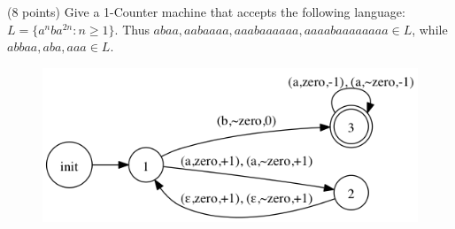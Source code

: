 \documentclass[paper=a4, fontsize=11pt]{scrartcl} %
\begin{document}
\pagebreak

\section{}

\begin{fancyquotes}
  (8 points) Give a 1-Counter machine that accepts the following
  language: $L = \{a^nba^{2n} : n\geq 1\}$. Thus $abaa, aabaaaa,
  aaabaaaaaa, aaaabaaaaaaaa \in L$, while $abbaa, aba, aaa \in L$.
\end{fancyquotes}

\begin{figure}[hp]
  \centering
  \includegraphics[width=\textwidth]{10-4.gv.png}
\end{figure}

\pagebreak
\end{document}
